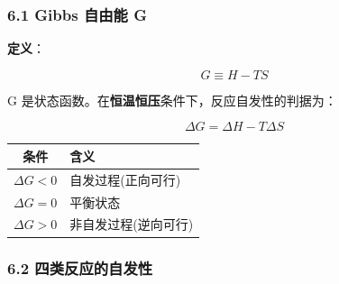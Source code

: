 \subsubsection{6.1 Gibbs 自由能 G}\label{gibbs-ux81eaux7531ux80fd-g}

\textbf{定义}：

\[
G \equiv H - TS
\]

G 是状态函数。在\textbf{恒温恒压}条件下，反应自发性的判据为：

\[
\boxed{\Delta G = \Delta H - T\Delta S}
\]

{\def\LTcaptype{none} %
\begin{longtable}[]{@{}cl@{}}
\toprule\noalign{}
条件 & 含义 \\
\midrule\noalign{}
\endhead
\bottomrule\noalign{}
\endlastfoot
\(\Delta G < 0\) & 自发过程(正向可行) \\
\(\Delta G = 0\) & 平衡状态 \\
\(\Delta G > 0\) & 非自发过程(逆向可行) \\
\end{longtable}
}

\subsubsection{6.2 四类反应的自发性}\label{ux56dbux7c7bux53cdux5e94ux7684ux81eaux53d1ux6027}

